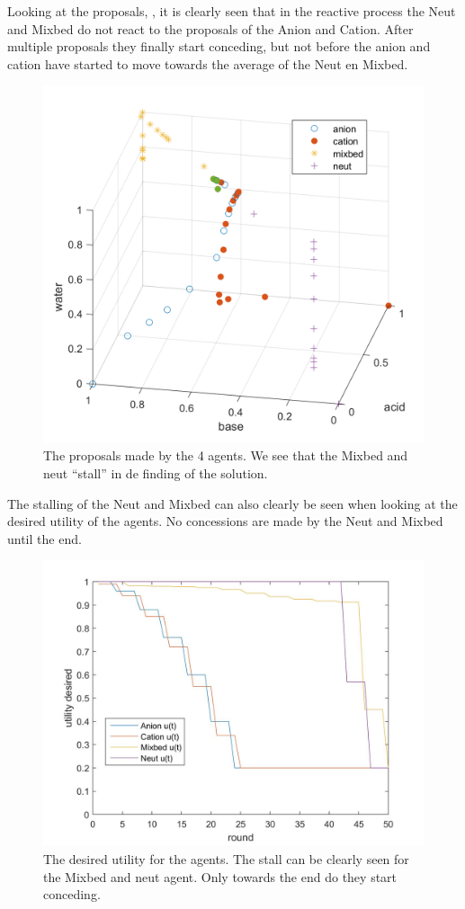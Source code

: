 Looking at the proposals, , it is clearly seen that in the reactive process the Neut and Mixbed do not react to the proposals of the Anion and Cation. After multiple proposals they finally start conceding, but not before the anion and cation have started to move towards the average of the Neut en Mixbed. 

\begin{figure}[h]
	\centering
	\includegraphics[width=0.7\linewidth]{img/reactive_4_plot}
	\caption{The proposals made by the 4 agents. We see that the Mixbed and neut ``stall'' in de finding of the solution.}
	\label{fig:reactive4plot}
\end{figure}

The stalling of the Neut and Mixbed can also clearly be seen when looking at the desired utility of the agents. No concessions are made by the Neut and Mixbed until the end.

\begin{figure}[h]
	\centering
	\includegraphics[width=0.7\linewidth]{img/desiredutility_reactive_4}
	\caption{The desired utility for the agents. The stall can be clearly seen for the Mixbed and neut agent. Only towards the end do they start conceding.}
	\label{fig:desiredutilityreactive4}
\end{figure}




